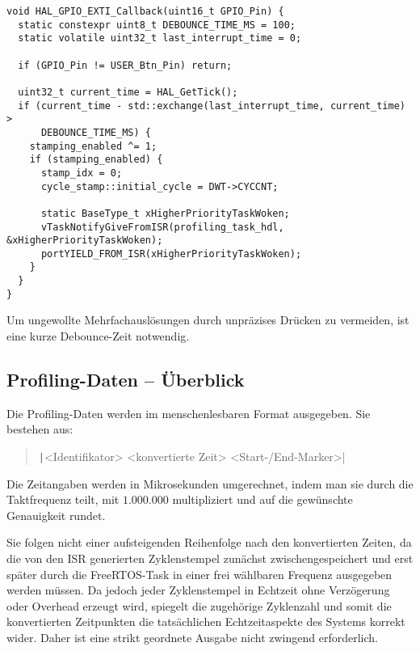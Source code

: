 \begin{code}
\begin{verbatim}
void HAL_GPIO_EXTI_Callback(uint16_t GPIO_Pin) {
  static constexpr uint8_t DEBOUNCE_TIME_MS = 100;
  static volatile uint32_t last_interrupt_time = 0;

  if (GPIO_Pin != USER_Btn_Pin) return;

  uint32_t current_time = HAL_GetTick();
  if (current_time - std::exchange(last_interrupt_time, current_time) >
      DEBOUNCE_TIME_MS) {
    stamping_enabled ^= 1;
    if (stamping_enabled) {
      stamp_idx = 0;
      cycle_stamp::initial_cycle = DWT->CYCCNT;

      static BaseType_t xHigherPriorityTaskWoken;
      vTaskNotifyGiveFromISR(profiling_task_hdl, &xHigherPriorityTaskWoken);
      portYIELD_FROM_ISR(xHigherPriorityTaskWoken);
    }
  }
}
\end{verbatim}
\end{code}

Um ungewollte Mehrfachauslösungen durch unpräzises Drücken zu vermeiden, ist
eine kurze Debounce-Zeit notwendig.

\subsection{Profiling-Daten -- Überblick}

Die Profiling-Daten werden im menschenlesbaren Format ausgegeben. Sie bestehen aus:

\begin{quote}
    \texttt|<Identifikator> <konvertierte Zeit> <Start-/End-Marker>|
\end{quote}

Die Zeitangaben werden in Mikrosekunden umgerechnet, indem man sie durch die
Taktfrequenz teilt, mit $1.000.000$ multipliziert und auf die gewünschte
Genauigkeit rundet.

Sie folgen nicht einer aufsteigenden Reihenfolge nach den konvertierten Zeiten,
da die von den ISR generierten Zyklenstempel zunächst zwischengespeichert und
erst später durch die FreeRTOS-Task in einer frei wählbaren Frequenz ausgegeben
werden müssen. Da jedoch jeder Zyklenstempel in Echtzeit ohne Verzögerung oder
Overhead erzeugt wird, spiegelt die zugehörige Zyklenzahl und somit die
konvertierten Zeitpunkten die tatsächlichen Echtzeitaspekte des Systems korrekt
wider. Daher ist eine strikt geordnete Ausgabe nicht zwingend erforderlich.

